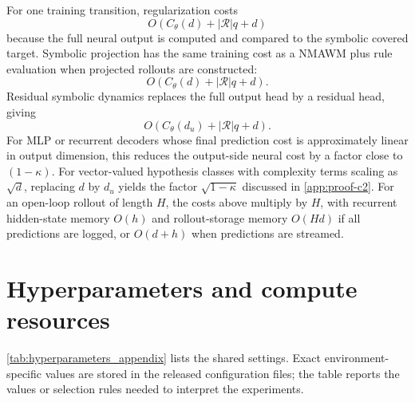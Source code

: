 \documentclass{article}
\theoremstyle{plain}
\theoremstyle{definition}
\theoremstyle{remark}
\begin{document}
For one training transition, regularization costs
\[
  O(C_\theta(d)+|\mathcal{R}|q+d)
\]
because the full neural output is computed and compared to the symbolic covered target. Symbolic projection has the same training cost as a NMAWM plus rule evaluation when projected rollouts are constructed:
\[
  O(C_\theta(d)+|\mathcal{R}|q+d).
\]
Residual symbolic dynamics replaces the full output head by a residual head, giving
\[
  O(C_\theta(d_u)+|\mathcal{R}|q+d).
\]
For MLP or recurrent decoders whose final prediction cost is approximately linear in output dimension, this reduces the output-side neural cost by a factor close to $(1-\kappa)$. For vector-valued hypothesis classes with complexity terms scaling as $\sqrt{d}$, replacing $d$ by $d_u$ yields the factor $\sqrt{1-\kappa}$ discussed in \autoref{app:proof-c2}. For an open-loop rollout of length $H$, the costs above multiply by $H$, with recurrent hidden-state memory $O(h)$ and rollout-storage memory $O(Hd)$ if all predictions are logged, or $O(d+h)$ when predictions are streamed.


\section{Hyperparameters and compute resources}
\label{app:hyperparameters-compute}

\autoref{tab:hyperparameters_appendix} lists the shared settings. Exact environment-specific values are stored in the released configuration files; the table reports the values or selection rules needed to interpret the experiments.
\end{document}
